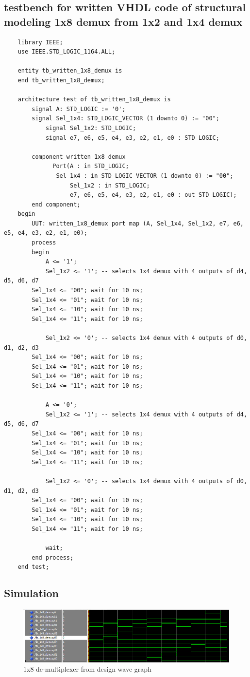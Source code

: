 \documentclass[12pt]{article}
\begin{document}
\subsection{testbench for written VHDL code of structural modeling 1x8 demux from 1x2 and 1x4 demux}
\begin{verbatim}
    library IEEE; 
    use IEEE.STD_LOGIC_1164.ALL;
    
    entity tb_written_1x8_demux is		
    end tb_written_1x8_demux;
    
    architecture test of tb_written_1x8_demux is
    	signal A: STD_LOGIC := '0';
    	signal Sel_1x4: STD_LOGIC_VECTOR (1 downto 0) := "00";
            signal Sel_1x2: STD_LOGIC;
            signal e7, e6, e5, e4, e3, e2, e1, e0 : STD_LOGIC;
    
    	component written_1x8_demux
              Port(A : in STD_LOGIC;
    	       Sel_1x4 : in STD_LOGIC_VECTOR (1 downto 0) := "00";
                   Sel_1x2 : in STD_LOGIC;
                   e7, e6, e5, e4, e3, e2, e1, e0 : out STD_LOGIC);
    	end component;
    begin
        UUT: written_1x8_demux port map (A, Sel_1x4, Sel_1x2, e7, e6, e5, e4, e3, e2, e1, e0);
        process
        begin
        	A <= '1';
            Sel_1x2 <= '1'; -- selects 1x4 demux with 4 outputs of d4, d5, d6, d7
    	Sel_1x4 <= "00"; wait for 10 ns;
    	Sel_1x4 <= "01"; wait for 10 ns;
    	Sel_1x4 <= "10"; wait for 10 ns;
    	Sel_1x4 <= "11"; wait for 10 ns;
    
            Sel_1x2 <= '0'; -- selects 1x4 demux with 4 outputs of d0, d1, d2, d3
    	Sel_1x4 <= "00"; wait for 10 ns;
    	Sel_1x4 <= "01"; wait for 10 ns;
    	Sel_1x4 <= "10"; wait for 10 ns;
    	Sel_1x4 <= "11"; wait for 10 ns;
    
        	A <= '0';
            Sel_1x2 <= '1'; -- selects 1x4 demux with 4 outputs of d4, d5, d6, d7
    	Sel_1x4 <= "00"; wait for 10 ns;
    	Sel_1x4 <= "01"; wait for 10 ns;
    	Sel_1x4 <= "10"; wait for 10 ns;
    	Sel_1x4 <= "11"; wait for 10 ns;
    
            Sel_1x2 <= '0'; -- selects 1x4 demux with 4 outputs of d0, d1, d2, d3
    	Sel_1x4 <= "00"; wait for 10 ns;
    	Sel_1x4 <= "01"; wait for 10 ns;
    	Sel_1x4 <= "10"; wait for 10 ns;
    	Sel_1x4 <= "11"; wait for 10 ns;
    
        	wait;
        end process;
    end test;
\end{verbatim}
\subsection{Simulation}
\begin{figure}[h]
\caption{1x8 de-multiplexer from design wave graph}
\includegraphics[width=\textwidth]{./diagrams/1x8_demux_simulation.png}
\end{figure}
\end{document}

